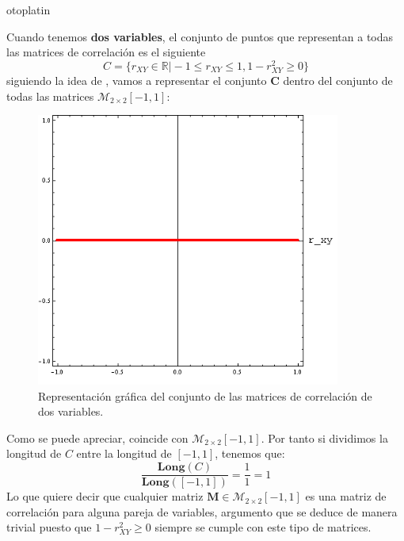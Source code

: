 otoplatin\documentclass[a4paper,openright,12pt]{report}
\begin{document}
Cuando tenemos \textbf{dos variables}, el conjunto de puntos que representan a todas las matrices de correlación es el siguiente $$C=\lbrace r_{XY}\in \mathbb{R} \vert -1\leq r_{XY} \leq 1, 1-r_{XY}^{2} \geq 0\rbrace$$ siguiendo la idea de \cite{Rousseeuw1994}, vamos a representar el conjunto \textbf{C} dentro del conjunto de todas las matrices $\mathcal{M}_{2\times  2}[-1,1]$:
\newpage
\medskip 
\begin{figure}[htb]
\begin{center}
\includegraphics[width=10cm]{matriz_correlacion_2vars}
\caption{Representación gráfica del conjunto de las matrices de correlación de dos variables.}
\label{Fig_matriz_correlacion_2vars}
\end{center}
\end{figure}

Como se puede apreciar, coincide con $\mathcal{M}_{2\times  2}[-1,1]$. Por tanto si dividimos la longitud de $C$ entre la longitud de $[-1,1]$, tenemos que: $$\dfrac{\mathbf{Long}(C)}{\mathbf{Long}([-1,1])}=\dfrac{1}{1}=1$$
Lo que quiere decir que cualquier matriz $\mathbf{M}\in \mathcal{M}_{2\times  2}[-1,1]$ es una matriz de correlación para alguna pareja de variables, argumento que se deduce de manera trivial puesto que $1-r_{XY}^{2} \geq 0$ siempre se cumple con este tipo de matrices.
\end{document}
